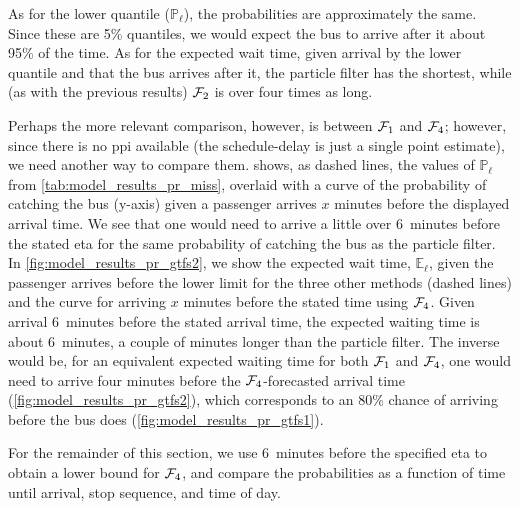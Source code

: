 As for the lower quantile ($\mathbb{P}_\ell$), the probabilities are approximately the same. Since these are 5\% quantiles, we would expect the bus to arrive after it about 95\% of the time. As for the expected wait time, given arrival by the lower quantile and that the bus arrives after it, the particle filter has the shortest, while (as with the previous results) $\mathcal{F}_2$ is over four times as long.


Perhaps the more relevant comparison, however, is between $\mathcal{F}_1$ and $\mathcal{F}_4$; however, since there is no \gls{ppi} available (the schedule-delay is just a single point estimate), we need another way to compare them.  shows, as dashed lines, the values of $\mathbb{P}_\ell$ from \cref{tab:model_results_pr_miss}, overlaid with a curve of the probability of catching the bus (y-axis) given a passenger arrives $x$ minutes before the displayed arrival time. We see that one would need to arrive a little over 6~minutes before the stated \gls{eta} for the same probability of catching the bus as the particle filter. In \cref{fig:model_results_pr_gtfs2}, we show the expected wait time, $\mathbb{E}_\ell$, given the passenger arrives before the lower limit for the three other methods (dashed lines) and the curve for arriving $x$ minutes before the stated time using $\mathcal{F}_4$. Given arrival 6~minutes before the stated arrival time, the expected waiting time is about 6~minutes, a couple of minutes longer than the particle filter. The inverse would be, for an equivalent expected waiting time for both $\mathcal{F}_1$ and $\mathcal{F}_4$, one would need to arrive four minutes before the $\mathcal{F}_4$-forecasted arrival time (\cref{fig:model_results_pr_gtfs2}), which corresponds to an 80\% chance of arriving before the bus does (\cref{fig:model_results_pr_gtfs1}).


For the remainder of this section, we use 6~minutes before the specified \gls{eta} to obtain a lower bound for $\mathcal{F}_4$, and compare the probabilities as a function of time until arrival, stop sequence, and time of day.



